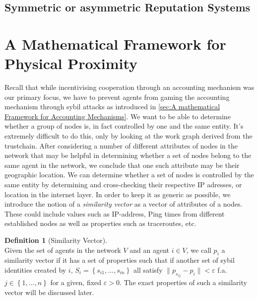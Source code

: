 \documentclass[11pt,a4paper]{article}
\theoremstyle{definition}
\newtheorem{definition}{Definition}[section]
\theoremstyle{theorem}
\theoremstyle{proposition}
\theoremstyle{corollary}
\theoremstyle{lemma}
\theoremstyle{example}
\theoremstyle{remark}
\begin{document}
\subsection{Symmetric or asymmetric Reputation Systems}
\label{subsec:Symmetric or asymmetric Reputation Systems}


\section{A Mathematical Framework for Physical Proximity}
\label{sec:A Mathematical Framework for Physical Proximity}
\noindent{}Recall that while incentivising cooperation through an accounting mechanism was our primary focus, we have to prevent agents from gaming the accounting mechanism through sybil attacks as introduced in \ref{sec:A mathematical Framework for Accounting Mechanisms}. We want to be able to determine whether a group of nodes is, in fact controlled by one and the same entity. It's extremely difficult to do this, only by looking at the work graph derived from the trustchain. After considering a number of different attributes of nodes in the network that may be helpful in determining whether a set of nodes belong to the same agent in the network, we conclude that one such attribute may be their geographic location. We can determine whether a set of nodes is controlled by the same entity by determining and cross-checking their respective IP adresses, or location in the internet layer. In order to keep it as generic as possible, we introduce the notion of a {\it similarity vector} as a vector of attributes of a nodes. These could include values such as IP-address, Ping times from different established nodes as well as properties such as traceroutes, etc.  \vspace{1em}\\

\begin{definition}[Similarity Vector]\ \\
Given the set of agents in the network $V$ and an agent $i\in{}V$, we call $p_i$ a similarity vector if it has a set of properties such that if another set of sybil identities created by $i$, $S_i=\left\lbrace{}s_{i1},\ldots,s_{in}\right\rbrace$ all satisfy $\|p_{s_{ij}}-p_i\|<\varepsilon$ f.a. $j\in\left\lbrace{}1,\ldots,n\right\rbrace$ for a given, fixed $\varepsilon > 0$. The exact properties of such a similarity vector will be discussed later. %
\end{definition}
\end{document}
